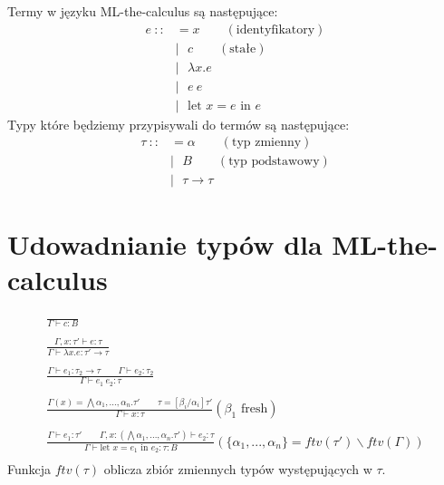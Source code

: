 \documentclass[a4paper,12pt]{book} %
\begin{document}
Termy w języku ML-the-calculus są następujące:
\begin{equation}
  \begin{split}
    e\ ::&=x\qquad(\text{identyfikatory})\\
    &|\ \ \ c\qquad(\text{stałe})\\
    &|\ \ \ \lambda x.e\\
    &|\ \ \ e\ e\\
    &|\ \ \ \text{let }x=e\text{ in }e
  \end{split}
\end{equation}
Typy które będziemy przypisywali do termów są następujące:
\begin{equation}
  \begin{split}
    \tau\ ::&=\alpha\qquad(\text{typ zmienny})\\
    &|\ \ \ B\qquad(\text{typ podstawowy})\\
    &|\ \ \ \tau\rightarrow\tau
  \end{split}
\end{equation}
\section{Udowadnianie typów dla ML-the-calculus}

\begin{gather*}
  \frac{}{\Gamma\vdash c:B} \\
  \\
  \frac{\Gamma,x:\tau'\vdash e:\tau}{\Gamma\vdash\lambda x.e:\tau'\rightarrow\tau} \\
  \\
  \frac{\Gamma\vdash e_1:\tau_2\rightarrow\tau\qquad\Gamma\vdash e_2:\tau_2}{\Gamma\vdash e_1\ e_2:\tau} \\
  \\
  \frac{\Gamma(x)=\bigwedge\alpha_1,...,\alpha_n.\tau'\qquad\tau=[\beta_i/\alpha_i]\tau'}{\Gamma\vdash x:\tau}(\beta_1\text{ fresh}) \\
  \\
  \frac{\Gamma\vdash e_1:\tau'\qquad\Gamma,x:(\bigwedge\alpha_1,...,\alpha_n.\tau')\vdash e_2:\tau}{\Gamma\vdash \text{let }x=e_1\text{ in }e_2:\tau:B}(\{\alpha_1,...,\alpha_n\}=ftv(\tau')\backslash ftv(\Gamma)) \\
\end{gather*}
Funkcja $ftv(\tau)$ oblicza zbiór zmiennych typów występujących w $\tau$.
\end{document}
